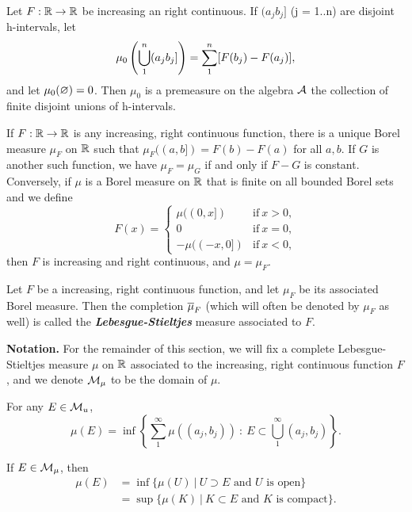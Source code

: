 \vs 

\begin{prop}
Let $F:\mathbb{R}\rightarrow \mathbb{R}$ be increasing an right continuous. If $(a_jb_j]$ (j = 1..n) are disjoint h-intervals, let 
\[\mu_0\left( \bigcup_1^n(a_jb_j]\right) = \sum_1^n[F(b_j) - F(a_j)],\]
and let $\mu_0(\varnothing) = 0$. Then $\mu_0$ is a premeasure on the algebra $\mathcal{A}$ the collection of finite disjoint unions of h-intervals. 
\end{prop}

\vs 

\begin{thm}
If $F:\mathbb{R}\rightarrow \mathbb{R}$ is any increasing, right continuous function, there is a unique Borel measure $\mu_F$ on $\mathbb{R}$ such that $\mu_F((a,b]) = F(b) - F(a)$ for all $a,b$. If $G$ is another such function, we have $\mu_F = \mu_G$ if and only if $F-G$ is constant. Conversely, if $\mu$ is a Borel measure on $\mathbb{R}$ that is finite on all bounded Borel sets and we define
\[F(x) = \begin{cases}
\mu((0,x])  & \text{if}\ x > 0,\\
0 & \text{if}\ x = 0,\\
-\mu((-x, 0]) & \text{if}\ x< 0,
\end{cases}\]
then $F$ is increasing and right continuous, and $\mu = \mu_F$.
\end{thm}

\vs 

\dfn Let $F$ be a increasing, right continuous function, and let $\mu_F$ be its associated Borel measure. Then the completion $\overline\mu_F$ (which will often be denoted by $\mu_F$ as well) is called the \textbf{\textit{Lebesgue-Stieltjes}} measure associated to $F$.

\textbf{Notation.} For the remainder of this section, we will fix a complete Lebesgue-Stieltjes measure $\mu$ on $\mathbb{R}$ associated to the increasing, right continuous function $F$, and we denote $\mathcal{M}_\mu$ to be the domain of $\mu$.

\vs 

\begin{lem}
For any $E\in \mathcal{M}_u$,
\[\mu(E) = \inf\left\{\sum_1^\infty\mu((a_j, b_j))\ :\ E\subset \bigcup_1^\infty(a_j, b_j)\right\}.\]
\end{lem}

\vs 

\begin{thm}
If $E\in \mathcal{M}_\mu$, then
\begin{align*}
\mu(E                       ) &= \inf\{\mu(U)\ |\ U\supset E\text{ and $U$ is open}\}\\
&=\sup\{\mu(K)\ |\ K\subset E\text{ and $K$ is compact}\}.
\end{align*}
\end{thm}

